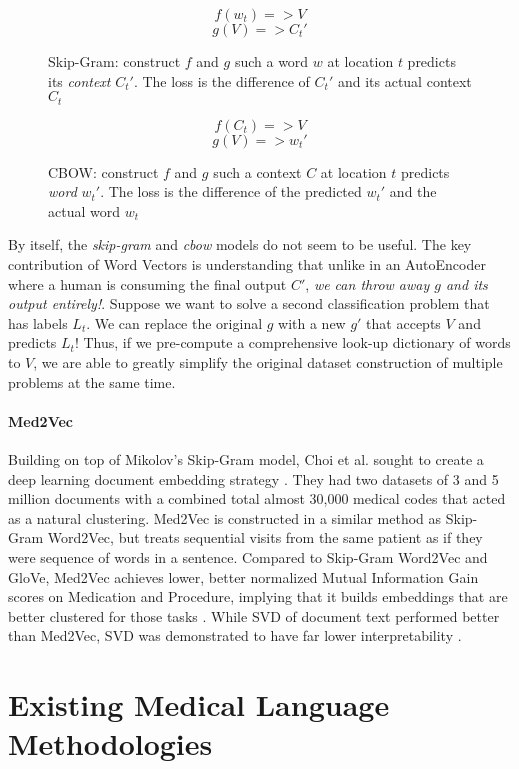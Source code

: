 \begin{figure}
\[ f(w_t) => V \]
\[ g(V) => C_t' \]
\caption{Skip-Gram: construct $f$ and $g$ such a word $w$ at location $t$ predicts its \textit{context} $C_t'$. The loss is the difference of $C_t'$ and its actual context $C_t$}
\end{figure}

\begin{figure}
\[ f(C_t) => V \]
\[ g(V) => w_t' \]
\caption{CBOW: construct $f$ and $g$ such a context $C$ at location $t$ predicts \textit{word} $w_t'$. The loss is the difference of the predicted $w_t'$ and the actual word $w_t$}
\end{figure}

\par{
By itself, the \textit{skip-gram} and \textit{cbow} models do not seem to be useful. The key contribution of Word Vectors is understanding that unlike in an AutoEncoder where a human is consuming the final output $C'$, \textit{we can throw away $g$ and its output entirely!}. Suppose we want to solve a second classification problem that has labels $L_t$. We can replace the original $g$ with a new $g'$ that accepts $V$ and predicts $L_t$! Thus, if we pre-compute a comprehensive look-up dictionary of words to $V$, we are able to greatly simplify the original dataset construction of multiple problems at the same time. 
}

\paragraph{Med2Vec} Building on top of Mikolov's Skip-Gram model, Choi et al. sought to create a deep learning document embedding strategy \cite{med2vec}. They had two datasets of 3 and 5 million documents with a combined total almost 30,000 medical codes that acted as a natural clustering. \textsf{Med2Vec} is constructed in a similar method as \textsf{Skip-Gram Word2Vec}, but treats sequential visits from the same patient as if they were sequence of words in a sentence. Compared to \textsf{Skip-Gram Word2Vec} and \textsf{GloVe}, \textsf{Med2Vec} achieves lower, better normalized Mutual Information Gain scores on Medication and Procedure, implying that it builds embeddings that are better clustered for those tasks \cite{GloVe}. While \textsf{SVD} of document text performed better than \textsf{Med2Vec}, \textsf{SVD} was demonstrated to have far lower interpretability \cite{svd}. 


\section{Existing Medical Language Methodologies}


